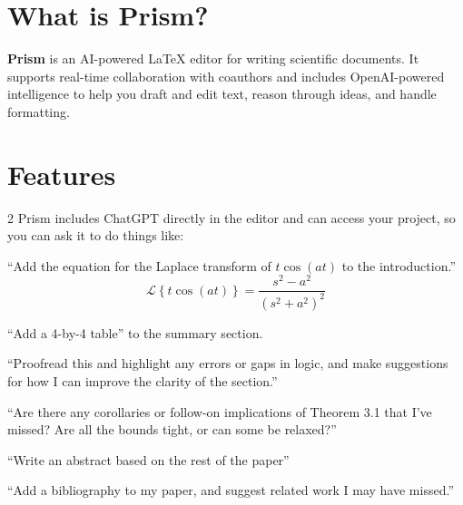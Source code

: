 \documentclass[11pt]{article}
\begin{document}
\section*{What is Prism?}

\textbf{Prism} is an AI-powered \LaTeX{} editor for writing scientific documents. It supports real-time collaboration with coauthors and includes OpenAI-powered intelligence to help you draft and edit text, reason through ideas, and handle formatting.

\section*{Features}

\begin{multicols}{2}
Prism includes ChatGPT directly in the editor and can access your project, so you can ask it to do things like:

``Add the equation for the Laplace transform of $t\cos(at)$ to the introduction.''
\[
  \mathcal{L}\left\{ t \cos(a t) \right\} = \frac{ s^2 - a^2 }{ (s^2 + a^2)^2 }
\]

``Add a 4-by-4 table'' to the summary section.
\begin{center}
\end{center}

``Proofread this and highlight any errors or gaps in logic, and make suggestions for how I can improve the clarity of the section.''

``Are there any corollaries or follow-on implications of Theorem 3.1 that I've missed? Are all the bounds tight, or can some be relaxed?''

\columnbreak

``Write an abstract based on the rest of the paper''

``Add a bibliography to my paper, and suggest related work I may have missed.''


\end{multicols}
\end{document}
